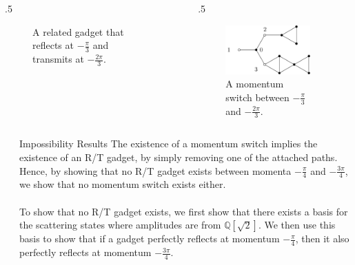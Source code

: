 \documentclass{beamer}
\newlength{\sepwid}
\newlength{\onecolwid}
\newlength{\twocolwid}
\newcommand{\QQ}{\mathbb{Q}}
\begin{document}
\begin{frame}[t]
\begin{columns}[t]
\begin{column}{\twocolwid}
\begin{columns}[t]
\begin{column}{.5\onecolwid}
\begin{figure}
          \caption{A related gadget that reflects at $-\frac{\pi}{3}$ and transmits at $-\frac{2\pi}{3}$.}
        \end{figure}
      \end{column}
      \begin{column}{\sepwid}
      \end{column}
      \begin{column}{.5\onecolwid}
        \begin{figure}
          \includegraphics[height=.25\onecolwid]{example_switch.pdf}
          \caption{A momentum switch between $-\frac{\pi}{3}$ and $-\frac{2\pi}{3}$.}
        \end{figure}
      \end{column}
      \end{columns}
    \end{column}
    \begin{column}{\sepwid}\end{column}
  \end{columns}
  
  \begin{columns}[t]
    \begin{column}{\sepwid}\end{column}
    \begin{column}{\onecolwid}
      \begin{block}{Impossibility Results}
          The existence of a momentum switch implies the existence of an R/T gadget, by simply removing one of the attached paths.  Hence, by showing that no R/T gadget exists between momenta $-\frac{\pi}{4}$ and $-\frac{3\pi}{4}$, we show that no momentum switch exists either.  
          \\~\\          
          To show that no R/T gadget exists, we first show that there exists a basis for the scattering states where amplitudes are from $\QQ[\sqrt{2}]$.  We then use this basis to show that if a gadget perfectly reflects at momentum $-\frac{\pi}{4}$, then it also perfectly reflects at momentum $-\frac{3\pi}{4}$.
          

\end{block}
\end{column}
\end{columns}
\end{frame}
\end{document}
